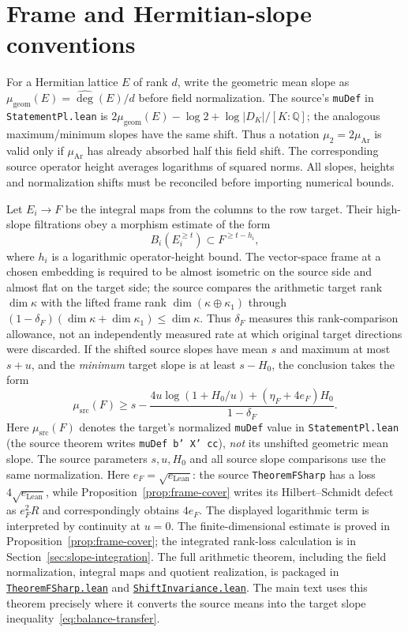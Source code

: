 \documentclass[11pt,openany,oneside]{scrbook}
\theoremstyle{definition}
\theoremstyle{remark}
\newcommand{\QQ}{\mathbb Q}
\newcommand{\baseurl}{https://github.com/CocoSgt/riemann-hypothesis-lean/blob/7cbf7a0c32fca1badf05931879a37c3f8a2b03b4/}
\newcommand{\sourcefile}[2]{\href{\baseurl#1}{\texttt{#2}}}
\begin{document}
\section{Frame and Hermitian-slope conventions}\label{app:slope-technical}

For a Hermitian lattice $E$ of rank $d$, write the geometric mean slope as $\mu_{\mathrm{geom}}(E)=\widehat\deg(E)/d$ before field normalization. The source's \texttt{muDef} in \texttt{StatementPl.lean} is $2\mu_{\mathrm{geom}}(E)-\log2+\log|D_K|/[K:\QQ]$; the analogous maximum/minimum slopes have the same shift. Thus a notation $\mu_2=2\mu_{\mathrm{Ar}}$ is valid only if $\mu_{\mathrm{Ar}}$ has already absorbed half this field shift. The corresponding source operator height averages logarithms of squared norms. All slopes, heights and normalization shifts must be reconciled before importing numerical bounds.

Let $E_i\to F$ be the integral maps from the columns to the row target.  Their high-slope filtrations obey a morphism estimate of the form
\[
B_i(E_i^{\ge t})\subset F^{\ge t-h_i},
\]
where $h_i$ is a logarithmic operator-height bound. The vector-space frame at a chosen embedding is required to be almost isometric on the source side and almost flat on the target side; the source compares the arithmetic target rank $\dim\kappa$ with the lifted frame rank $\dim(\kappa\oplus\kappa_1)$ through $(1-\delta_F)(\dim\kappa+\dim\kappa_1)\le\dim\kappa$. Thus $\delta_F$ measures this rank-comparison allowance, not an independently measured rate at which original target directions were discarded. If the shifted source slopes have mean $s$ and maximum at most $s+u$, and the \emph{minimum} target slope is at least $s-H_0$, the conclusion takes the form
\[
\mu_{\mathrm{src}}(F)\ge s-\frac{4u\log(1+H_0/u)+(\eta_F+4e_F)H_0}{1-\delta_F}.
\]
Here $\mu_{\mathrm{src}}(F)$ denotes the target's normalized \texttt{muDef} value in \texttt{StatementPl.lean} (the source theorem writes \texttt{muDef b' X' cc}), \emph{not} its unshifted geometric mean slope. The source parameters $s,u,H_0$ and all source slope comparisons use the same normalization.
Here $e_F=\sqrt{e_{\mathrm{Lean}}}$: the source \texttt{TheoremFSharp} has a loss $4\sqrt{e_{\mathrm{Lean}}}$, while Proposition~\ref{prop:frame-cover} writes its Hilbert--Schmidt defect as $e_F^2R$ and correspondingly obtains $4e_F$. The displayed logarithmic term is interpreted by continuity at $u=0$. The finite-dimensional estimate is proved in Proposition~\ref{prop:frame-cover}; the integrated rank-loss calculation is in Section~\ref{sec:slope-integration}.  The full arithmetic theorem, including the field normalization, integral maps and quotient realization, is packaged in
\sourcefile{src/Formalism/HarderNarasimhan/HarderNarasimhanProofs/TheoremFSharp.lean}{TheoremFSharp.lean} and \sourcefile{src/Formalism/HarderNarasimhan/ShiftInvariance.lean}{ShiftInvariance.lean}.  The main text uses this theorem precisely where it converts the source means into the target slope inequality~\eqref{eq:balance-transfer}.
\end{document}

